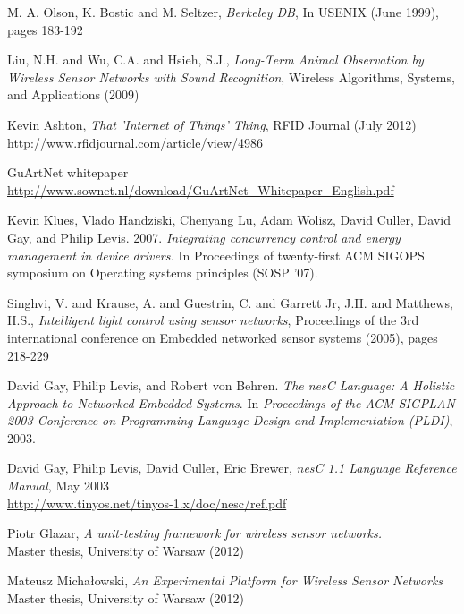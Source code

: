 \begin{thebibliography}{99}

M. A. Olson, K. Bostic and M. Seltzer,
\textit{Berkeley DB},
In USENIX (June 1999), pages 183-192

Liu, N.H. and Wu, C.A. and Hsieh, S.J.,
\textit{Long-Term Animal Observation by Wireless Sensor Networks with Sound Recognition},
Wireless Algorithms, Systems, and Applications (2009)

Kevin Ashton,
\textit{That 'Internet of Things' Thing},
RFID Journal (July 2012) \url{http://www.rfidjournal.com/article/view/4986}

GuArtNet whitepaper \url{http://www.sownet.nl/download/GuArtNet\_Whitepaper\_English.pdf}

  Kevin Klues, Vlado Handziski, Chenyang Lu, Adam Wolisz, David Culler, David Gay, and Philip Levis. 2007.
  \textit{Integrating concurrency control and energy management in device drivers.}
  In Proceedings of twenty-first ACM SIGOPS symposium on Operating systems principles (SOSP '07). 

Singhvi, V. and Krause, A. and Guestrin, C. and Garrett Jr, J.H. and Matthews, H.S.,
\textit{Intelligent light control using sensor networks},
Proceedings of the 3rd international conference on Embedded networked sensor systems (2005), pages 218-229

  David Gay, Philip Levis, and Robert von Behren.
  \textit{The nesC Language: A Holistic Approach
  to Networked Embedded Systems}.  \newblock In
  {\em Proceedings of the ACM SIGPLAN 2003
  Conference on Programming Language Design and
  Implementation (PLDI)}, 2003.

  David Gay, Philip Levis, David Culler, Eric Brewer,
  \textit{nesC 1.1 Language Reference Manual},
  May 2003 \\
  \url{http://www.tinyos.net/tinyos-1.x/doc/nesc/ref.pdf}


  Piotr Glazar, \textit{A unit-testing framework
  for wireless sensor networks.} \\ Master thesis,
  University of Warsaw (2012)

  Mateusz Michałowski, \textit{An Experimental Platform
  for Wireless Sensor Networks} \\ Master thesis,
  University of Warsaw (2012)


\end{thebibliography}
